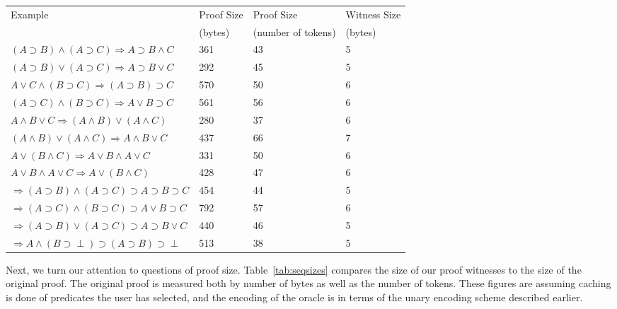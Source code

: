 \documentclass{llncs}
\begin{document}
\begin{table*}[htbp]
\begin{center}
\begin{small}
\begin{tabular}{|l|l|l|l|}
\hline
Example & Proof Size & Proof Size & Witness Size \\
& (bytes) & (number of tokens) & (bytes)\\
\hline
$(A\supset B)\wedge (A\supset C)\Rightarrow A\supset B\wedge C$
&       361 
&       43 
&       5 \\
$(A\supset B)\vee (A\supset C)\Rightarrow A\supset B\vee C$
&       292 
&       45 
&       5 \\
$A\vee C\wedge (B\supset C)\Rightarrow (A\supset B)\supset C$
&       570 
&       50 
&       6 \\
$(A\supset C)\wedge (B\supset C)\Rightarrow A\vee B\supset C$
&       561 
&       56 
&       6 \\
$A\wedge B\vee C\Rightarrow (A\wedge B)\vee (A\wedge C)$
&       280 
&       37 
&       6 \\
$(A\wedge B)\vee (A\wedge C)\Rightarrow A\wedge B\vee C$
&       437 
&       66 
&       7 \\
$A\vee (B\wedge C)\Rightarrow A\vee B\wedge A\vee C$
&       331 
&       50 
&       6 \\
$A\vee B\wedge A\vee C\Rightarrow A\vee (B\wedge C)$
&       428 
&       47 
&       6 \\
$\Rightarrow (A\supset B)\wedge (A\supset C)\supset A\supset B\supset C$
&       454 
&       44 
&       5 \\
$\Rightarrow (A\supset C)\wedge (B\supset C)\supset A\vee B\supset C$
&       792 
&       57 
&       6 \\
$\Rightarrow (A\supset B)\vee (A\supset C)\supset A\supset B\vee C$
&       440 
&       46 
&       5 \\
$\Rightarrow A\wedge (B\supset \perp)\supset (A\supset B)\supset \perp$ 
&       513 
&       38 
&       5 \\
\hline
\end{tabular}
\end{small}
\end{center}
\caption{\label{tab:seqsizes}
Sequent Calculus: Sizes with Caching of User-Selected Predicates}
\end{table*}

Next, we turn our attention to questions of proof size. 
Table~\ref{tab:seqsizes} compares the size of our proof witnesses to the
size of the original proof. The original proof is measured both by number 
of bytes as well as the number of tokens. These figures are assuming 
caching is done of predicates the user has selected, and the encoding of
the oracle is in terms of the unary encoding scheme described earlier.
\end{document}
